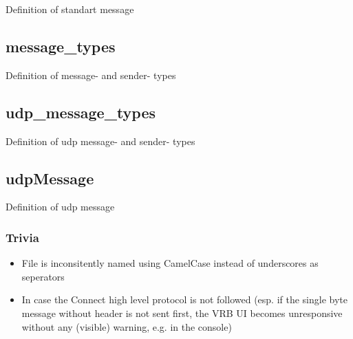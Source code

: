Definition of standart message

\subsection{message\_types}

Definition of message- and sender- types 

\subsection{udp\_message\_types}
Definition of udp message- and sender- types 

\subsection{udpMessage}
Definition of udp message


\subsubsection{Trivia}

\begin{itemize}
	\item File is inconsitently named using CamelCase instead of underscores as seperators
	\item In case the Connect high level protocol is not followed (esp. if the single byte message without header is not sent first, the VRB UI becomes unresponsive without any (visible) warning, e.g. in the console)
\end{itemize}

